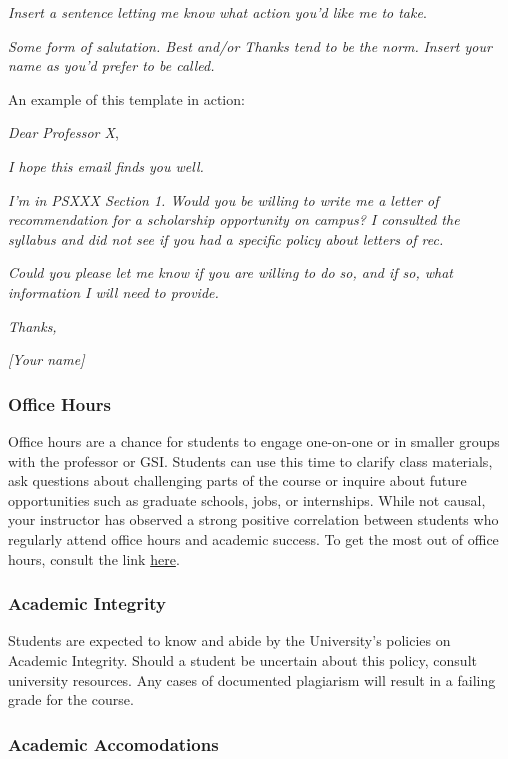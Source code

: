 \documentclass[
  11pt,
]{article}
\begin{document}
\emph{Insert a sentence letting me know what action you'd like me to
take}.

\emph{Some form of salutation. Best and/or Thanks tend to be the norm.}
\emph{Insert your name as you'd prefer to be called.}

An example of this template in action:

\emph{Dear Professor X},

\emph{I hope this email finds you well.}

\emph{I'm in PSXXX Section 1. Would you be willing to write me a letter
of recommendation for a scholarship opportunity on campus? I consulted
the syllabus and did not see if you had a specific policy about letters
of rec.}

\emph{Could you please let me know if you are willing to do so, and if
so, what information I will need to provide.}

\emph{Thanks,}

\emph{{[}Your name{]}}

\hypertarget{office-hours}{%
\subsubsection{Office Hours}\label{office-hours}}

Office hours are a chance for students to engage one-on-one or in
smaller groups with the professor or GSI. Students can use this time to
clarify class materials, ask questions about challenging parts of the
course or inquire about future opportunities such as graduate schools,
jobs, or internships. While not causal, your instructor has observed a
strong positive correlation between students who regularly attend office
hours and academic success. To get the most out of office hours, consult
the link
\href{https://lsc.cornell.edu/wp-content/uploads/2015/10/What-Are-Office-Hours.pdf}{here}.

\hypertarget{academic-integrity}{%
\subsubsection{Academic Integrity}\label{academic-integrity}}

Students are expected to know and abide by the University's policies on
Academic Integrity. Should a student be uncertain about this policy,
consult university resources. Any cases of documented plagiarism will
result in a failing grade for the course.

\hypertarget{academic-accomodations}{%
\subsubsection{Academic Accomodations}\label{academic-accomodations}}
\end{document}
